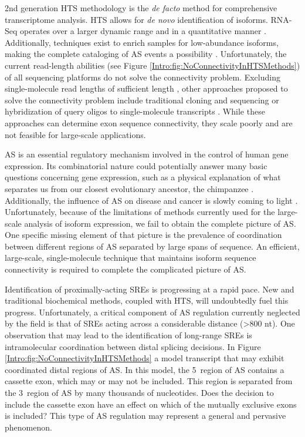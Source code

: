     2nd generation HTS methodology is the \textit{de facto} method for comprehensive transcriptome analysis. HTS allows for \textit{de novo} identification of isoforms. RNA-Seq operates over a larger dynamic range and in a quantitative manner \citep{Mortazavi2008}. Additionally, techniques exist to enrich samples for low-abundance isoforms, making the complete cataloging of AS events a possibility \citep{Djebali2008, Salehi-Ashtiani2008}. Unfortunately, the current read-length abilities (see Figure \ref{Intro:fig:NoConnectivityInHTSMethods}) of all sequencing platforms do not solve the connectivity problem. Excluding single-molecule read lengths of sufficient length \citep{Shendure2004}, other approaches proposed to solve the connectivity problem include traditional cloning and sequencing or hybridization of query oligos to single-molecule transcripts \citep{Zhu2003, Calarco2007, Emerick2007}. While these approaches can determine exon sequence connectivity, they scale poorly and are not feasible for large-scale applications.

    AS is an essential regulatory mechanism involved in the control of human gene expression. Its combinatorial nature could potentially answer many basic questions concerning gene expression, such as a physical explanation of what separates us from our closest evolutionary ancestor, the chimpanzee \citep{Calarco2007a}. Additionally, the influence of AS on disease and cancer is slowly coming to light \citep{Tazi2009}. Unfortunately, because of the limitations of methods currently used for the large-scale analysis of isoform expression, we fail to obtain the complete picture of AS. One specific missing element of that picture is the prevalence of coordination between different regions of AS separated by large spans of sequence. An efficient, large-scale, single-molecule technique that maintains isoform sequence connectivity is required to complete the complicated picture of AS.

    Identification of proximally-acting SREs is progressing at a rapid pace. New and traditional biochemical methods, coupled with HTS, will undoubtedly fuel this progress. Unfortunately, a critical component of AS regulation currently neglected by the field is that of SREs acting across a considerable distance (>800 nt). One observation that may lead to the identification of long-range SREs is intramolecular coordination between distal splicing decisions. In Figure \ref{Intro:fig:NoConnectivityInHTSMethods} a model transcript that may exhibit coordinated distal regions of AS. In this model, the 5\textprime~region of AS contains a cassette exon, which may or may not be included. This region is separated from the 3\textprime~region of AS by many thousands of nucleotides. Does the decision to include the cassette exon have an effect on which of the mutually exclusive exons is included? This type of AS regulation may represent a general and pervasive phenomenon.

